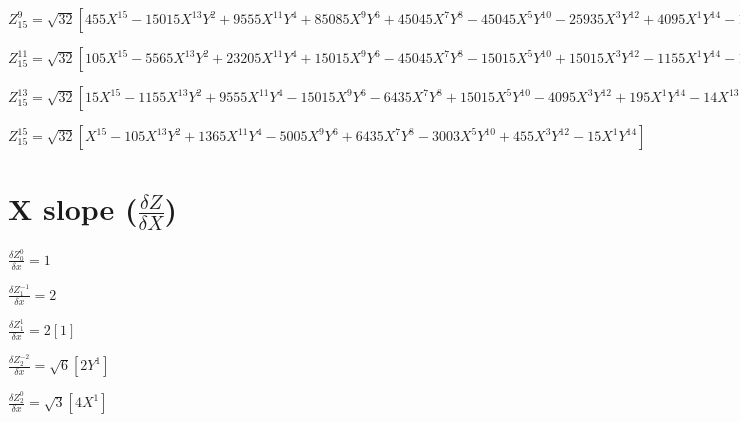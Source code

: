 \documentclass[10pt,landscape]{article}
\begin{document}
\vspace{1.2 mm}
\noindent $ Z^{9}_{15} = \sqrt{32} [455X^{15} -15015X^{13}Y^{2} +9555X^{11}Y^{4} +85085X^{9}Y^{6} +45045X^{7}Y^{8} -45045X^{5}Y^{10} -25935X^{3}Y^{12} +4095X^{1}Y^{14} -1092X^{13} +37128X^{11}Y^{2} -60060X^{9}Y^{4} -144144X^{7}Y^{6} +36036X^{5}Y^{8} +72072X^{3}Y^{10} -9828X^{1}Y^{12} +858X^{11} -30030X^{9}Y^{2} +77220X^{7}Y^{4} +36036X^{5}Y^{6} -64350X^{3}Y^{8} +7722X^{1}Y^{10} -220X^{9} +7920X^{7}Y^{2} -27720X^{5}Y^{4} +18480X^{3}Y^{6} -1980X^{1}Y^{8}] $

\vspace{1.2 mm}
\noindent $ Z^{11}_{15} = \sqrt{32} [105X^{15} -5565X^{13}Y^{2} +23205X^{11}Y^{4} +15015X^{9}Y^{6} -45045X^{7}Y^{8} -15015X^{5}Y^{10} +15015X^{3}Y^{12} -1155X^{1}Y^{14} -182X^{13} +9828X^{11}Y^{2} -50050X^{9}Y^{4} +24024X^{7}Y^{6} +54054X^{5}Y^{8} -28028X^{3}Y^{10} +2002X^{1}Y^{12} +78X^{11} -4290X^{9}Y^{2} +25740X^{7}Y^{4} -36036X^{5}Y^{6} +12870X^{3}Y^{8} -858X^{1}Y^{10}] $

\vspace{1.2 mm}
\noindent $ Z^{13}_{15} = \sqrt{32} [15X^{15} -1155X^{13}Y^{2} +9555X^{11}Y^{4} -15015X^{9}Y^{6} -6435X^{7}Y^{8} +15015X^{5}Y^{10} -4095X^{3}Y^{12} +195X^{1}Y^{14} -14X^{13} +1092X^{11}Y^{2} -10010X^{9}Y^{4} +24024X^{7}Y^{6} -18018X^{5}Y^{8} +4004X^{3}Y^{10} -182X^{1}Y^{12}] $

\vspace{1.2 mm}
\noindent $ Z^{15}_{15} = \sqrt{32} [X^{15} -105X^{13}Y^{2} +1365X^{11}Y^{4} -5005X^{9}Y^{6} +6435X^{7}Y^{8} -3003X^{5}Y^{10} +455X^{3}Y^{12} -15X^{1}Y^{14}] $

\vspace{1.2 mm}
\clearpage

\section{X slope ($\frac{\delta Z}{\delta X}$)}

\noindent $ \frac{\delta Z^{0}_{0}}{\delta x} = 1 $

\vspace{1.2 mm}
\noindent $ \frac{\delta Z^{-1}_{1}}{\delta x} = 2 $

\vspace{1.2 mm}
\noindent $ \frac{\delta Z^{1}_{1}}{\delta x} = 2 [1] $

\vspace{1.2 mm}
\noindent $ \frac{\delta Z^{-2}_{2}}{\delta x} = \sqrt{6} [2Y^{1}] $

\vspace{1.2 mm}
\noindent $ \frac{\delta Z^{0}_{2}}{\delta x} = \sqrt{3} [4X^{1}] $
\end{document}
